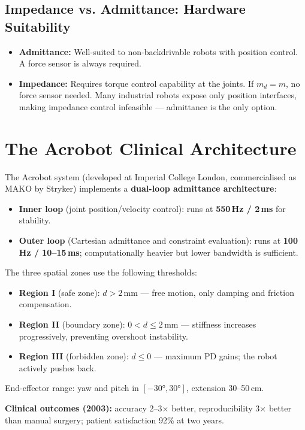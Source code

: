 \documentclass[11pt,a4paper,twoside]{report}
\begin{document}
\subsection{Impedance vs. Admittance: Hardware Suitability}
\begin{itemize}
    \item \textbf{Admittance:} Well-suited to non-backdrivable robots with position control. A force sensor is always required.
    \item \textbf{Impedance:} Requires torque control capability at the joints. If $m_d = m$, no force sensor needed. Many industrial robots expose only position interfaces, making impedance control infeasible — admittance is the only option.
\end{itemize}

\section{The Acrobot Clinical Architecture}
The Acrobot system (developed at Imperial College London, commercialised as MAKO by Stryker) implements a \textbf{dual-loop admittance architecture}:
\begin{itemize}
    \item \textbf{Inner loop} (joint position/velocity control): runs at \textbf{550\,Hz / 2\,ms} for stability.
    \item \textbf{Outer loop} (Cartesian admittance and constraint evaluation): runs at \textbf{100\,Hz / 10--15\,ms}; computationally heavier but lower bandwidth is sufficient.
\end{itemize}
The three spatial zones use the following thresholds:
\begin{itemize}
    \item \textbf{Region I} (safe zone): $d > 2$\,mm — free motion, only damping and friction compensation.
    \item \textbf{Region II} (boundary zone): $0 < d \leq 2$\,mm — stiffness increases progressively, preventing overshoot instability.
    \item \textbf{Region III} (forbidden zone): $d \leq 0$ — maximum PD gains; the robot actively pushes back.
\end{itemize}
End-effector range: yaw and pitch in $[-30°, 30°]$, extension 30--50\,cm.

\textbf{Clinical outcomes (2003):} accuracy 2--3$\times$ better, reproducibility 3$\times$ better than manual surgery; patient satisfaction 92\% at two years.
\end{document}
